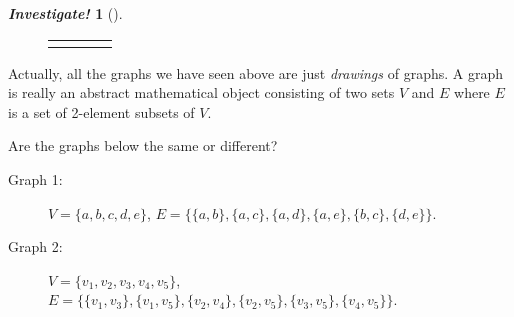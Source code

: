 \documentclass[10pt,]{book}
\theoremstyle{plain}
\theoremstyle{definition}
\theoremstyle{definition}
\newtheorem{investigation}[project]{\emph{Investigate!}}
\theoremstyle{definition}
\numberwithin{equation}{chapter}
\newlength{\panelmax}
\newcommand{\vtx}[2]{node[fill,circle,inner sep=0pt, minimum size=4pt,label=#1:#2]{}}
\renewcommand{\v}{\vtx{above}{}}
\begin{document}
\begin{investigation}[]
{{{{
}
}}
\newlength{\phBNimage}\setlength{\phBNimage}{\ht\panelboxBNimage+\dp\panelboxBNimage}
\settototalheight{\phBNimage}{\usebox{\panelboxBNimage}}
\setlength{\panelmax}{\maxof{\panelmax}{\phBNimage}}
\leavevmode%
\setlength{\tabcolsep}{0\textwidth}
\begin{figure}
\begin{tabular}{@{}*{4}{c}@{}}
\begin{minipage}[c][\panelmax][t]{0.25\textwidth}\usebox{\panelboxBKimage}\end{minipage}&
\begin{minipage}[c][\panelmax][t]{0.25\textwidth}\usebox{\panelboxBLimage}\end{minipage}&
\begin{minipage}[c][\panelmax][t]{0.25\textwidth}\usebox{\panelboxBMimage}\end{minipage}&
\begin{minipage}[c][\panelmax][t]{0.25\textwidth}\usebox{\panelboxBNimage}\end{minipage}\end{tabular}
\end{figure}
}%
\par

Actually, all the graphs we have seen above are just \emph{drawings} of graphs. A graph is really an abstract mathematical object consisting of two sets \(V\) and \(E\) where \(E\) is a set of 2-element subsets of \(V\).
%
\par

Are the graphs below the same or different?
%
\leavevmode%
\begin{description}
\item[Graph 1:]\hypertarget{li-1196}{}\(V = \{a, b, c, d, e\}\), \(E = \{\{a,b\}, \{a, c\}, \{a,d\}, \{a,e\}, \{b,c\}, \{d,e\}\}\).\item[Graph 2:]\hypertarget{li-1197}{}\(V = \{v_1, v_2, v_3, v_4, v_5\}\), \(E = \{\{v_1, v_3\}, \{v_1, v_5\}, \{v_2, v_4\}, \{v_2, v_5\}, \{v_3, v_5\}, \{v_4, v_5\}\}\).\end{description}
\end{investigation}
\end{document}
